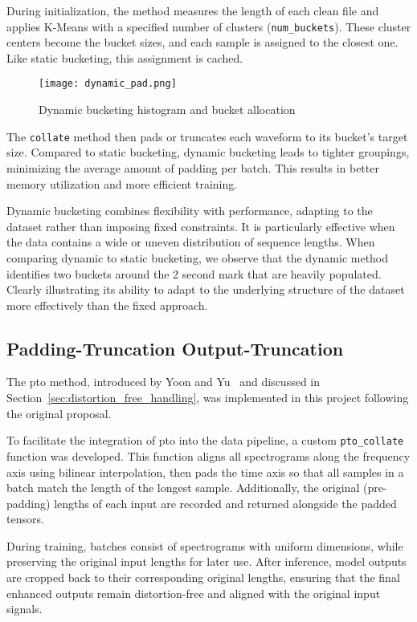 During initialization, the method measures the length of each clean file and applies K-Means with a specified number of clusters (\texttt{num\_buckets}). These cluster centers become the bucket sizes, and each sample is assigned to the closest one. Like static bucketing, this assignment is cached.

\begin{figure}[H]
    \centering
    \texttt{[image: dynamic\_pad.png]}
    \caption{Dynamic bucketing histogram and bucket allocation}
    \label{fig:dynamic_pad}
\end{figure}

The \texttt{collate} method then pads or truncates each waveform to its bucket's target size. Compared to static bucketing, dynamic bucketing leads to tighter groupings, minimizing the average amount of padding per batch. This results in better memory utilization and more efficient training.

Dynamic bucketing combines flexibility with performance, adapting to the dataset rather than imposing fixed constraints. It is particularly effective when the data contains a wide or uneven distribution of sequence lengths. When comparing dynamic to static bucketing, we observe that the dynamic method identifies two buckets around the 2 second mark that are heavily populated. Clearly illustrating its ability to adapt to the underlying structure of the dataset more effectively than the fixed approach.


\subsection{Padding-Truncation Output-Truncation}
\label{subsec:pto_dataset}

The \gls{pto} method, introduced by Yoon and Yu~\cite{yoon2020pto} and discussed in Section~\ref{sec:distortion_free_handling}, was implemented in this project following the original proposal.

To facilitate the integration of \gls{pto} into the data pipeline, a custom \texttt{pto\_collate} function was developed. This function aligns all spectrograms along the frequency axis using bilinear interpolation, then pads the time axis so that all samples in a batch match the length of the longest sample. Additionally, the original (pre-padding) lengths of each input are recorded and returned alongside the padded tensors.

During training, batches consist of spectrograms with uniform dimensions, while preserving the original input lengths for later use. After inference, model outputs are cropped back to their corresponding original lengths, ensuring that the final enhanced outputs remain distortion-free and aligned with the original input signals.

